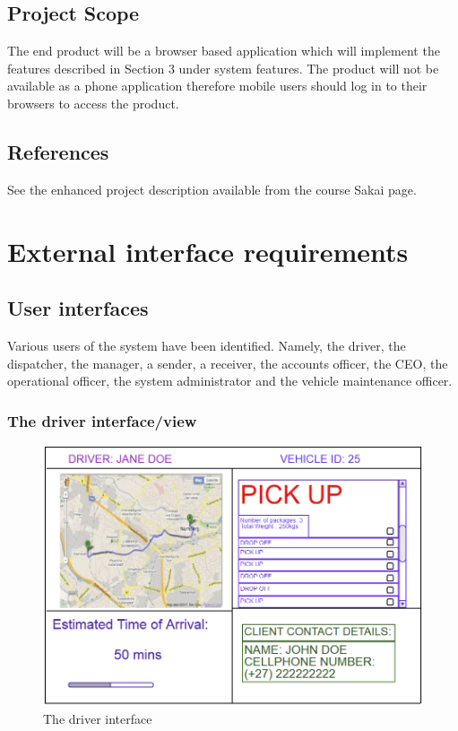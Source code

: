 \documentclass[paper=a4, fontsize=11pt]{scrartcl} %
\numberwithin{equation}{section} %
\numberwithin{figure}{section} %
\numberwithin{table}{section} %
\begin{document}
\subsection{Project Scope}
The end product will be a browser based application which will implement the features described in Section 3 under system features. The product will not be available as a phone application therefore mobile users should log in to their browsers to access the product. 

\subsection{References}
See the enhanced project description available from the course Sakai page.


\section{External interface requirements}
\subsection{User interfaces}
Various users of the system have been identified. Namely, the driver, the dispatcher, the manager, a sender, a receiver, the accounts officer, the CEO, the operational officer, the system administrator and the vehicle maintenance officer.

\subsubsection{The driver interface/view}
\begin{figure}[ht!]
\centering
\includegraphics[width=5in]{pictures/driver.png}
\caption{The driver interface}
\label{Driver}
\end{figure}
\end{document}

